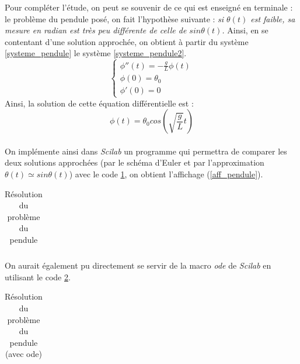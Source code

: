 \documentclass[a4paper,10pt]{report}
\begin{document}
Pour compléter l'étude, on peut se souvenir de ce qui est enseigné en terminale : le problème du pendule posé, on fait l'hypothèse suivante : \textit{si $\theta(t)$ est faible, sa mesure en radian est très peu différente de celle de $sin\theta(t)$.} Ainsi, en se contentant d'une solution approchée, on obtient à partir du système \ref{systeme_pendule} le système \ref{systeme_pendule2}.
\begin{equation}
\label{systeme_pendule2}
\left\lbrace
\begin{array}{l}
\phi''(t)= -\frac{g}{L}\phi (t)  \\
\phi(0)=\theta_0 \\
\phi'(0)=0
\end{array}\right.
\end{equation}
\indent Ainsi, la solution de cette équation différentielle est :
\begin{equation}
\phi(t)=\theta_0 cos \left( \sqrt{\frac{g}{L}}t \right)
\end{equation}\\

On implémente ainsi dans \textit{Scilab} un programme qui permettra de comparer les deux solutions approchées (par le schéma d'Euler et par l'approximation $\theta(t)\simeq sin\theta(t)$) avec le code \ref{code_pendule}, on obtient l'affichage (\ref{aff_pendule}).
\begin{table}[H]
\caption{Résolution du problème du pendule}
\begin{tabular}{l}

\label{code_pendule}
\end{tabular}
\end{table}

On aurait également pu directement se servir de la macro \textit{ode} de \textit{Scilab} en utilisant le code \ref{code_pendule_ode}. 
\begin{table}[H]
\caption{Résolution du problème du pendule (avec ode)}
\begin{tabular}{l}

\label{code_pendule_ode}
\end{tabular}
\end{table}
\end{document}
